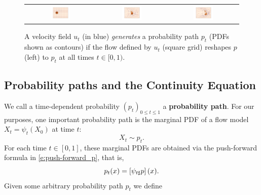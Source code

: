 \documentclass{fairmeta}
\newcommand{\highlight}[1]{{\color{metablue} \textbf{#1}}}
\numberwithin{equation}{section}
\begin{document}
\begin{figure}
    \centering
    \begin{tabular}{ccc}
         \includegraphics[width=0.3\textwidth]{assets/flow_velocity/flow_1_.png} &
         \includegraphics[width=0.3\textwidth]{assets/flow_velocity/flow_10_.png} &
         \includegraphics[width=0.3\textwidth]{assets/flow_velocity/flow_16_.png} 
    \end{tabular}
    \caption{ A velocity field $u_t$ (in blue) \emph{generates} a probability path $p_t$ (PDFs shown as contours) if the flow defined by $u_t$ (square grid) reshapes $p$ (left) to $p_t$ at all times $t\in [0,1)$.}
    \label{fig:ut_generates_pt}
\end{figure}

\pagebreak
\subsection{Probability paths and the Continuity Equation} \label{ss:continuity_equation}
We call a time-dependent probability $(p_t)_{0\leq t \leq 1}$ a \highlight{probability path}.
For our purposes, one important probability path is the marginal PDF of a flow model $X_t = \psi_t(X_0)$ at time $t$:
\begin{equation}
    X_t\sim p_t. %
\end{equation}
For each time $t \in [0,1]$, these marginal PDFs are obtained via the push-forward formula in \cref{e:push-forward_p}, that is,
\begin{equation}\label{e:p_t_flow}
    p_t(x) = \brac{\psi_{t\sharp}p}(x). %
\end{equation}
Given some arbitrary probability path $p_t$ we define 
\end{document}
